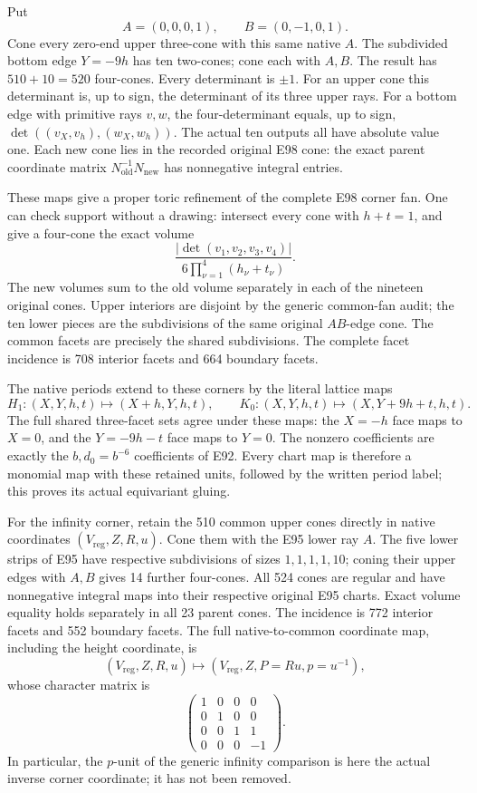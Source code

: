 Put
\[
 A=(0,0,0,1),\qquad B=(0,-1,0,1).
\]
Cone every zero-end upper three-cone with this same native \(A\).
The subdivided bottom edge \(Y=-9h\) has ten two-cones; cone each with \(A,B\).
The result has \(510+10=520\) four-cones. Every determinant is \(\pm1\).
For an upper cone this determinant is, up to sign, the determinant of its three upper rays. For a bottom edge with primitive rays \(v,w\), the four-determinant equals, up to sign,
\(\det((v_X,v_h),(w_X,w_h))\). The actual ten outputs all have absolute value one. Each new cone lies in the recorded original E98 cone: the exact parent coordinate matrix \(N_{\mathrm{old}}^{-1}N_{\mathrm{new}}\) has nonnegative integral entries.

These maps give a proper toric refinement of the complete E98 corner fan. One can check support without a drawing: intersect every cone with \(h+t=1\), and give a four-cone the exact volume
\[
 \frac{|\det(v_1,v_2,v_3,v_4)|}
 {6\prod_{\nu=1}^{4}(h_\nu+t_\nu)}.
 \tag{E100.3}
\]
The new volumes sum to the old volume separately in each of the nineteen original cones. Upper interiors are disjoint by the generic common-fan audit; the ten lower pieces are the subdivisions of the same original \(AB\)-edge cone. The common facets are precisely the shared subdivisions. The complete facet incidence is 708 interior facets and 664 boundary facets.

The native periods extend to these corners by the literal lattice maps
\[
 H_1:(X,Y,h,t)\longmapsto(X+h,Y,h,t),\qquad
 K_0:(X,Y,h,t)\longmapsto(X,Y+9h+t,h,t).
 \tag{E100.4}
\]
The full shared three-facet sets agree under these maps: the \(X=-h\) face maps to \(X=0\), and the \(Y=-9h-t\) face maps to \(Y=0\). The nonzero coefficients are exactly the \(b,d_0=b^{-6}\) coefficients of E92. Every chart map is therefore a monomial map with these retained units, followed by the written period label; this proves its actual equivariant gluing.

For the infinity corner, retain the 510 common upper cones directly in native coordinates \((V_{\mathrm{reg}},Z,R,u)\). Cone them with the E95 lower ray \(A\). The five lower strips of E95 have respective subdivisions of sizes \(1,1,1,1,10\); coning their upper edges with \(A,B\) gives 14 further four-cones. All 524 cones are regular and have nonnegative integral maps into their respective original E95 charts. Exact volume equality holds separately in all 23 parent cones. The incidence is 772 interior facets and 552 boundary facets. The full native-to-common coordinate map, including the height coordinate, is
\[
 (V_{\mathrm{reg}},Z,R,u)\longmapsto
 (V_{\mathrm{reg}},Z,P=Ru,p=u^{-1}),
 \tag{E100.5}
\]
whose character matrix is
\[
 \begin{pmatrix}
 1&0&0&0\\0&1&0&0\\0&0&1&1\\0&0&0&-1
 \end{pmatrix}.
\]
In particular, the \(p\)-unit of the generic infinity comparison is here the actual inverse corner coordinate; it has not been removed.

